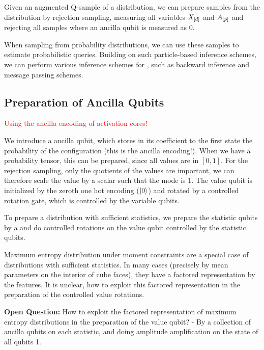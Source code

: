 \documentclass[aps,onecolumn,nofootinbib,pra]{article}
\newcommand{\red}[1]{\textcolor{red}{#1}}
\begin{document}
    Given an augmented Q-sample of a distribution, we can prepare samples from the distribution by rejection sampling, measuring all variables $X_{[d]}$ and $A_{[p]}$ and rejecting all samples where an ancilla qubit is measured as $0$.

    When sampling from probability distributions, we can use these samples to estimate probabilistic queries.
    Building on such particle-based inference schemes, we can perform various inference schemes for \ComputationActivationNetworks{}, such as backward inference and message passing schemes.

    \subsection{Preparation of Ancilla Qubits}

    \red{Using the ancilla encoding of activation cores!}

    We introduce a ancilla qubit, which stores in its coefficient to the first state the probability of the configuration (this is the ancilla encoding!).
    When we have a probability tensor, this can be prepared, since all values are in $[0,1]$.
    For the rejection sampling, only the quotients of the values are important, we can therefore scale the value by a scalar such that the mode is $1$.
    The value qubit is initialized by the zeroth one hot encoding ($\ket{0}$) and rotated by a controlled rotation gate, which is controlled by the variable qubits.

    To prepare a distribution with sufficient statistics, we prepare the statistic qubits by a \computationCircuit{} and do controlled rotations on the value qubit controlled by the statistic qubits.

    Maximum entropy distribution under moment constraints are a special case of distributions with sufficient statistics.
    In many cases (precisely by mean parameters on the interior of cube faces), they have a factored representation by the features.
    It is unclear, how to exploit this factored representation in the preparation of the controlled value rotations.

    \textbf{Open Question:} How to exploit the factored representation of maximum entropy distributions in the preparation of the value qubit?
    - By a collection of ancilla qubits on each statistic, and doing amplitude amplification on the state of all qubits 1.
\end{document}
